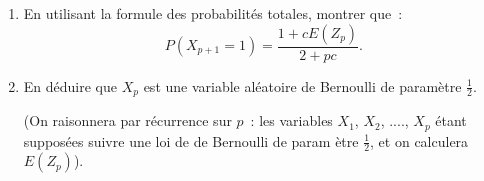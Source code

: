 \begin{exercice}
\begin{enumerate}
\begin{enumerate}
\item En utilisant la formule des probabilit\'{e}s totales, montrer que~: 
\begin{equation*}
P(X_{p+1}=1)=\frac{1+cE(Z_{p})}{2+pc}.
\end{equation*}

\item En d\'{e}duire que $X_{p}$ est une variable al\'{e}atoire de Bernoulli
de param\`{e}tre $\displaystyle\frac{1}{2}$.

(On raisonnera par r\'{e}currence sur $p$~: les variables $X_{1}$, $X_{2}$,
...., $X_{p}$ \'{e}tant suppos\'{e}es suivre une loi de de Bernoulli de param%
\`{e}tre $\displaystyle\frac{1}{2}$, et on calculera $E(Z_{p})$).
\end{enumerate}
\end{enumerate}

\end{exercice}


